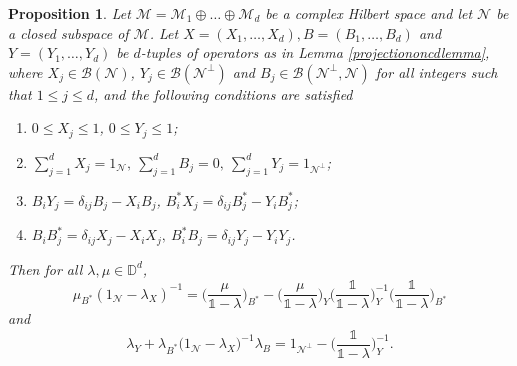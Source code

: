 \documentclass[11pt, reqno]{amsart}
\newtheorem{proposition}[theorem]{Proposition}
\newcommand\1{\boldsymbol {1}}
\numberwithin{equation}{section}
\begin{document}
\begin{proposition}\label{generalizedmodelprop}
Let $\mathcal{M} = \mathcal{M}_{1}\oplus \hdots \oplus \mathcal{M}_{d}$ be a complex Hilbert space and let $\mathcal{N}$ be a closed subspace of $\mathcal{M}$.  Let $X=(X_{1},\hdots, X_{d}), B=(B_{1},\hdots, B_{d})$ and $ Y=(Y_{1},\hdots, Y_{d})$ be  $d$-tuples of operators as in Lemma \ref{projectiononcdlemma}, where $X_{j}\in \mathcal{B}(\mathcal{N})$, $Y_{j} \in \mathcal{B}(\mathcal{N}^{\perp})$ and $B_{j} \in \mathcal{B}(\mathcal{N}^{\perp},\mathcal{N})$ for all integers such that $1\leq j \leq d$, and the following conditions are satisfied
\begin{enumerate}
  \item  $0 \leq X_{j} \leq 1$, $ 0 \leq Y_{j} \leq 1$;
  \item $\sum_{j=1}^{d} X_{j} = 1_{\mathcal{N}},~\sum_{j=1}^{d} B_{j} = 0, ~ \sum_{j=1}^{d} Y_{j} = 1_{\mathcal{N}^{\perp}}$;
  \item $B_{i}Y_{j} =  \delta_{ij}B_{j}-X_{i}B_{j}$, $B_{i}^{*}X_{j} =  \delta_{ij}B_{j}^{*}-Y_{i}B_{j}^{*} $;
  \item $B_{i}B^{*}_{j} =  \delta_{ij}X_{j}-X_{i}X_{j}, ~B^{*}_{i}B_{j} =  \delta_{ij}Y_{j}-Y_{i}Y_{j}$.
\end{enumerate}
Then for all $\lambda, \mu \in \mathbb{D}^{d}$,
\begin{equation}\label{mubadjointoperatoridentity}
\mu_{B^{*}}(1_{\mathcal{N}}-\lambda_{X})^{-1} = \bigg(\dfrac{\mu}{\mathds{1}-\lambda}\bigg)_{B^{*}} - \bigg( \dfrac{\mu}{\mathds{1}-\lambda}\bigg)_{Y}\bigg(\dfrac{\mathds{1}}{\mathds{1}-\lambda}\bigg)_{Y}^{-1}\bigg(\dfrac{\mathds{1}}{\mathds{1}-\lambda}\bigg)_{B^{*}}
\end{equation}
and
\begin{equation}\label{lambdaypluslambdabstar}
\lambda_{Y}+\lambda_{B^{*}}\big(1_{\mathcal{N}}-\lambda_{X}\big)^{-1}\lambda_{B} = 1_{\mathcal{N}^{\perp}}-\bigg(\dfrac{\mathds{1}}{\mathds{1}-\lambda}\bigg)_{Y}^{-1}.
\end{equation}
\end{proposition}
\end{document}
